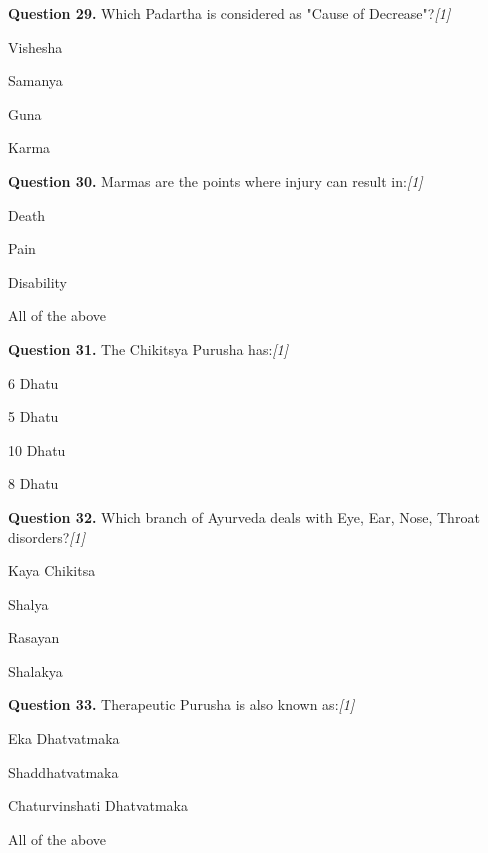 \documentclass[11pt,a4paper]{article}
\newcommand{\pts}[1]{\hfill   \textit{[#1]}}
\begin{document}
\medskip


\noindent   \textbf{Question 29.} Which Padartha is considered as "Cause of Decrease"?\pts{1}

\begin{parts}
  \item Vishesha
  \item Samanya
  \item Guna
  \item Karma
\end{parts}

\medskip


\noindent   \textbf{Question 30.} Marmas are the points where injury can result in:\pts{1}

\begin{parts}
  \item Death
  \item Pain
  \item Disability
  \item All of the above
\end{parts}

\medskip


\noindent   \textbf{Question 31.} The Chikitsya Purusha has:\pts{1}

\begin{parts}
  \item 6 Dhatu
  \item 5 Dhatu
  \item 10 Dhatu
  \item 8 Dhatu
\end{parts}

\medskip


\noindent   \textbf{Question 32.} Which branch of Ayurveda deals with Eye, Ear, Nose, Throat disorders?\pts{1}

\begin{parts}
  \item Kaya Chikitsa
  \item Shalya
  \item Rasayan
  \item Shalakya
\end{parts}

\medskip


\noindent   \textbf{Question 33.} Therapeutic Purusha is also known as:\pts{1}

\begin{parts}
  \item Eka Dhatvatmaka
  \item Shaddhatvatmaka
  \item Chaturvinshati Dhatvatmaka
  \item All of the above
\end{parts}
\end{document}
